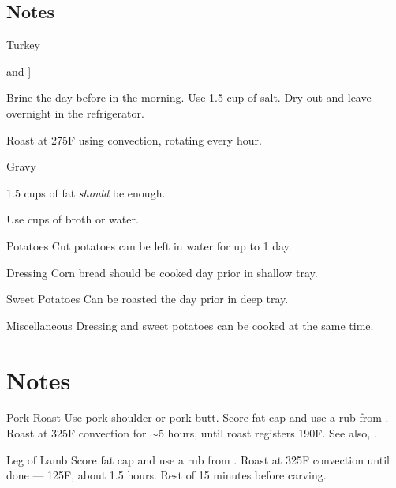 \documentclass[oneside]{book}  %
\def\thisrecipe{}  %
\newcommand{\recipe}[1]{\section{#1}\def\thisrecipe{: #1}} %
\newcommand{\degF}{\textdegree F\xspace}
\newcommand{\about}{$\sim$}
\begin{document}
\subsection{Notes}
\begin{twocols} \begin{kitchennotes}
  \item[Turkey] \begin{kitchensubnotes}
    \item \todo[cf.\ \CICookbook[353] and \CIMeat[439]]
    \item Brine the day before in the morning. Use 1.5 cup of salt. Dry out and
      leave overnight in the refrigerator.
    \item Roast at 275\degF using convection, rotating every hour. 
  \end{kitchensubnotes}

  \item[Gravy] \begin{kitchensubnotes}
    \item 1.5 cups of fat \emph{should} be enough.
    \item Use  cups of broth or water.
  \end{kitchensubnotes}

  \item[Potatoes]
  Cut potatoes can be left in water for up to 1 day.

  \item[Dressing]
  Corn bread should be cooked day prior in shallow tray.

  \item[Sweet Potatoes]
  Can be roasted the day prior in deep tray.

  \item[Miscellaneous]
    Dressing and sweet potatoes can be cooked at the same time.
\end{kitchennotes} \end{twocols}
\recipe{Notes} \label{notes:dinners_leftovers} %
\begin{kitchennotes}
  \item[Pork Roast]  
    Use pork shoulder or pork butt. Score fat cap and use a rub from
    . Roast at 325\degF convection for
    \about 5 hours, until roast registers 190\degF. See also, \CICookbook[418].
  \item[Leg of Lamb]  
    Score fat cap and use a rub from . Roast
    at 325\degF convection until done --- 125\degF, about 1.5 hours. Rest of 15
    minutes before carving.
\end{kitchennotes}
\end{document}
